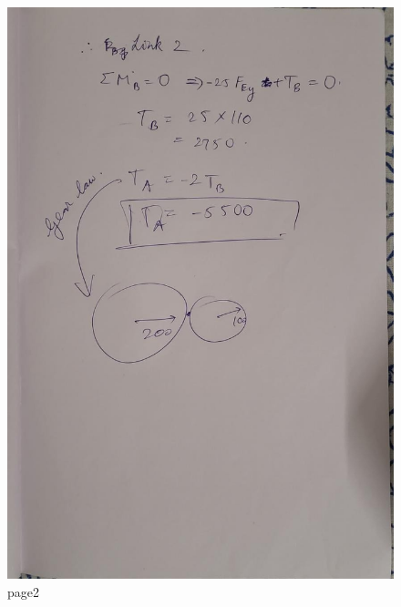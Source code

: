     \begin{figure}[hbt!]
        \centering
        \includegraphics[width=0.9\columnwidth]{Images/proof2.jpeg}
        \caption{page2}
        \label{fig:page2}
    \end{figure}
